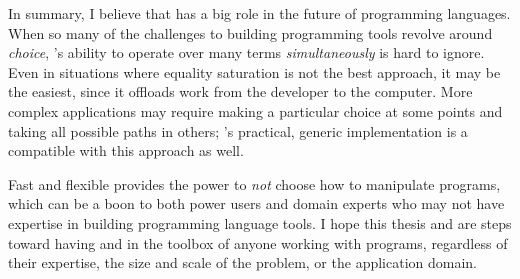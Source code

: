 In summary,
 I believe that \eqsat has a big role in the future of programming
 languages.
When so many of the challenges to building programming tools
 revolve around \textit{choice},
 \eqsat's ability to operate over many terms \textit{simultaneously}
 is hard to ignore.
Even in situations where equality saturation is not the best approach,
 it may be the easiest,
 since it offloads work from the developer
 to the computer.
More complex applications may require
 making a particular choice at some points and
 taking all possible paths in others;
 \egg's practical, generic implementation is a compatible
 with this approach as well.

Fast and flexible \eqsat
 provides the power to \textit{not} choose how to manipulate
 programs,
 which can be a boon to both power users and
 domain experts who may not have expertise in building programming
 language tools.
I hope this thesis and \egg are steps toward
 having \egraphs and \eqsat in the toolbox
 of anyone working with programs,
 regardless of their expertise,
 the size and scale of the problem,
 or the application domain.








